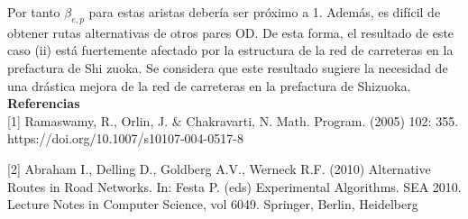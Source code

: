 \documentclass[10pt]{report}
\begin{document}
Por tanto $\beta_{e,p}$ para estas aristas debería ser próximo a 1.
Además, es difícil de obtener rutas alternativas de otros pares OD. De esta forma, el resultado de este caso (ii)  está fuertemente afectado por la estructura de la red de carreteras en la prefactura de Shi zuoka. Se considera que este resultado sugiere la necesidad de una drástica mejora de la red de carreteras en la prefactura de Shizuoka.\\

\textbf{Referencias}\\

[1] Ramaswamy, R., Orlin, J. $\&$ Chakravarti, N. Math. Program. (2005) 102: 355. https://doi.org/10.1007/s10107-004-0517-8

[2] Abraham I., Delling D., Goldberg A.V., Werneck R.F. (2010) Alternative Routes in Road Networks. In: Festa P. (eds) Experimental Algorithms. SEA 2010. Lecture Notes in Computer Science, vol 6049. Springer, Berlin, Heidelberg
\end{document}
